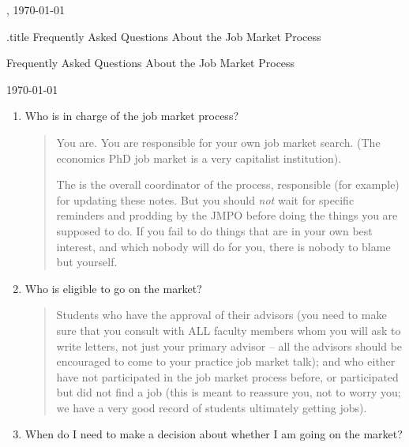 \documentclass{\classes/econtex}
\providecommand\phantomsection{}
\begin{document}
\hfill{\tiny \jobname, \today} \vspace{.1in}

\begin{verbatimwrite}{\jobname.title}
  Frequently Asked Questions About the Job Market Process
\end{verbatimwrite}

\centerline{\Large Frequently Asked Questions About the Job Market Process}\medskip\medskip

\centerline{\today}\medskip\medskip

\ifdvi\large\fi

\begin{enumerate}

\item Who is in charge of the job market process?
  \begin{quote}
    You are.  You are responsible for your own job market search.  (The economics PhD job market is a very capitalist institution).

    The \JMPO is the overall coordinator of the process, responsible (for example) for updating these notes.  But you should \textit{not} wait for specific reminders and prodding by the JMPO before doing the things you are supposed to do. If you fail to do things that are in your own best interest, and which nobody will do for you, there is nobody to blame but yourself.

  \end{quote}

\item  Who is eligible to go on the market?
  \begin{quote}  
    Students who have the approval of their advisors (you need to make
    sure that you consult with ALL faculty members whom you will ask to
    write letters, not just your primary advisor -- all the advisors
    should be encouraged to come to your practice job market talk); and
    who either have not participated in the job market process before,
    or participated but did not find a job (this is meant to reassure
    you, not to worry you; we have a very good record of students
    ultimately getting jobs).

    \ifdvi\phantomsection\hypertarget{DecideByWhen}{}\fi
    
  \end{quote}

\item  When do I need to make a decision about whether I am going on
  the market?


\end{enumerate}
\end{document}
